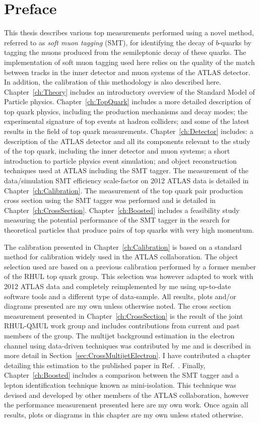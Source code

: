 \thispagestyle{empty}
\vspace{1cm}
\chapter*{Preface}
This thesis describes various top measurements performed using a novel method, referred to as \emph{soft muon tagging} (SMT), for identifying the decay of $b$-quarks by tagging the muons produced from the semileptonic decay of these quarks. The implementation of soft muon tagging used here relies on the quality of the match between tracks in the inner detector and muon systems of the ATLAS detector. In addition, the calibration of this methodology is also described here.
Chapter~\ref{ch:Theory} includes an introductory overview of the Standard Model of Particle physics. Chapter~\ref{ch:TopQuark} includes a more detailed description of top quark physics, including the production mechanisms and decay modes; the experimental signature of top events at hadron colliders; and some of the latest results in the field of top quark measurements. Chapter~\ref{ch:Detector} includes: a description of the ATLAS detector and all its components relevant to the study of the top quark, including the inner detector and muon systems; a short introduction to particle physics event simulation; and object reconstruction techniques used at ATLAS including the SMT tagger. The measurement of the data/simulation SMT efficiency scale-factor on 2012 ATLAS data is detailed in Chapter~\ref{ch:Calibration}. The measurement of the top quark pair production cross section using the SMT tagger was performed and is detailed in Chapter~\ref{ch:CrossSection}. Chapter~\ref{ch:Boosted} includes a feasibility study measuring the potential performance of the SMT tagger in the search for theoretical particles that produce pairs of top quarks with very high momentum.

The calibration presented in Chapter~\ref{ch:Calibration} is based on a standard method for calibration widely used in the ATLAS collaboration. The object selection used are based on a previous calibration performed by a former member of the RHUL top quark group. This selection was however adapted to work with 2012 ATLAS data and completely reimplemented by me using up-to-date software tools and a different type of data-sample. All results, plots and/or diagrams presented are my own unless otherwise noted. The cross section measurement presented in Chapter~\ref{ch:CrossSection} is the result of the joint RHUL-QMUL work group and includes contributions from current and past members of the group. The multijet background estimation in the electron channel using data-driven techniques was contributed by me and is described in more detail in Section~\ref{sec:CrossMultijetElectron}. I have contributed a chapter detailing this estimation to the published paper in Ref.~\cite{Cross:SMTCrossSectionPaper}. Finally, Chapter~\ref{ch:Boosted} includes a comparison between the SMT tagger and a lepton identification technique known as mini-isolation. This technique was devised and developed by other members of the ATLAS collaboration, however the performance measurement presented here are my own work. Once again all results, plots or diagrams in this chapter are my own unless stated otherwise.
